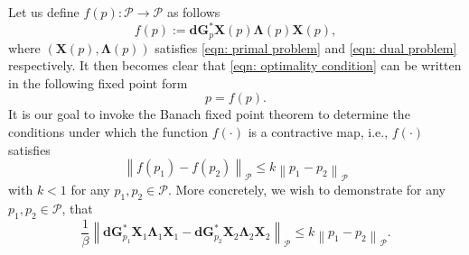 \documentclass{amsart}
\newcommand{\p}[1]{\left( {#1} \right)}
\newcommand{\norm}[1]{\left\| #1 \right\|}
\newcommand{\sP}{\mathcal{P}}
\newcommand{\bX}{\mathbf X}
\newcommand{\bG}{\mathbf G}
\newcommand{\bLambda}{\boldsymbol{\Lambda}}
\newcommand{\bd}{\mathbf d}
\begin{document}
Let us define $f(p): \sP \rightarrow \sP$ as follows
$$
    f(p) := \bd\bG_p^*\bX(p)\bLambda(p)\bX(p),
$$
where $\p{\bX(p),\bLambda(p)}$ satisfies \eqref{eqn: primal problem} and \eqref{eqn: dual problem} respectively. It then becomes clear that \eqref{eqn: optimality condition} can be written in the following fixed point form
$$
    p = f(p).
$$
It is our goal to invoke the Banach fixed point theorem \cite[Theorem 3.7-1]{ciarlet2025linear} to determine the conditions under which the function $f(\cdot)$ is a contractive map, i.e., $f(\cdot)$ satisfies
$$
    \norm{f(p_1) - f(p_2)}_{\sP} \leq k \norm{p_1 - p_2}_{\sP}
$$
with $k < 1$ for any $p_1,p_2 \in \sP$. More concretely, we wish to demonstrate for any $p_1,p_2\in\sP$, that
\begin{equation} \label{eqn: contraction condition}
    \frac{1}{\beta}\norm{\bd\bG_{p_1}^*\bX_1\bLambda_1\bX_1 - \bd\bG_{p_2}^*\bX_2\bLambda_2\bX_2}_{\sP} \leq k\norm{p_1 - p_2}_{\sP}.
\end{equation}
\end{document}
